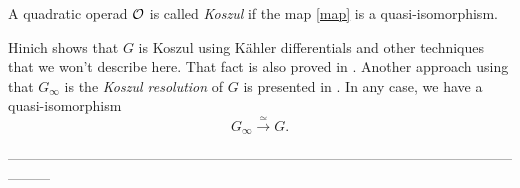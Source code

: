 \documentclass[TFM.tex]{subfiles}
\begin{document}
\begin{defi}
A quadratic operad ${\mathcal O}$ is called \emph{Koszul} if the map \ref{map} is a quasi-isomorphism.
\end{defi}

Hinich \cite{Hinich} shows that $G$ is Koszul using Kähler differentials and other techniques that we won't describe here. That fact is also proved in \cite{GJHinich}. Another approach using that $G_\infty$ is the \emph{Koszul resolution} of $G$ is presented in \cite{AlgebraicOperads}. In any case, we have a quasi-isomorphism
\begin{equation}
G_\infty\xrightarrow{\simeq} G.
\end{equation}


%






---------------------------------------------------------------------------------------------------------------------

\end{document}
